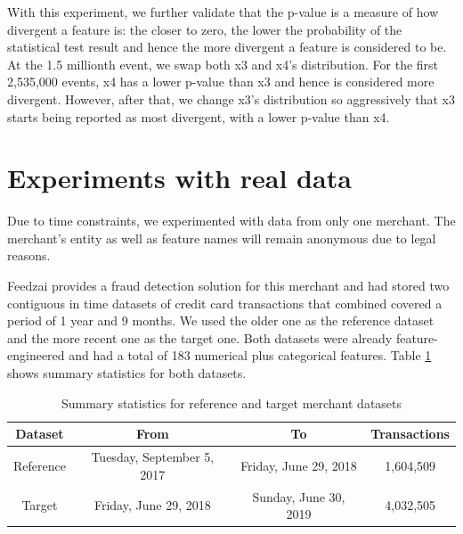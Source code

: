 With this experiment, we further validate that the p-value is a measure of how divergent a feature is: the closer to zero, the lower the probability of the statistical test result and hence the more divergent a feature is considered to be. At the 1.5 millionth event, we swap both x3 and x4's distribution. For the first 2,535,000 events, x4 has a lower p-value than x3 and hence is considered more divergent. However, after that, we change x3's distribution so aggressively that x3 starts being reported as most divergent, with a lower p-value than x4.

\clearpage
\section{Experiments with real data}

Due to time constraints, we experimented with data from only one merchant. The merchant's entity as well as feature names will remain anonymous due to legal reasons.

Feedzai provides a fraud detection solution for this merchant and had stored two contiguous in time datasets of credit card transactions that combined covered a period of 1 year and 9 months. We used the older one as the reference dataset and the more recent one as the target one. Both datasets were already feature-engineered \cite{Domingos-ML-Feat-Eng} and had a total of 183 numerical plus categorical features. Table \ref{tbl:merchant1-datasets-summary} shows summary statistics for both datasets.
\begin{table}[!htb]
    \begin{center}
        \begin{tabular}{|c|c|c|c|}
        \hline
        \textbf{Dataset} & \textbf{From}              & \textbf{To}           & \multicolumn{1}{l|}{\textbf{Transactions}} \\ \hline
        Reference        & Tuesday, September 5, 2017 & Friday, June 29, 2018 & 1,604,509                                  \\ \hline
        Target           & Friday, June 29, 2018      & Sunday, June 30, 2019 & 4,032,505                                  \\ \hline
        \end{tabular}
        \caption{Summary statistics for reference and target merchant datasets}
        \label{tbl:merchant1-datasets-summary}
    \end{center}
\end{table}

